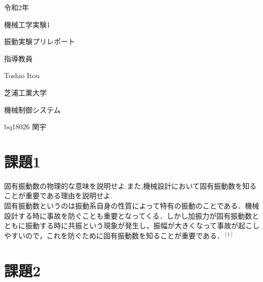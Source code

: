\documentclass[xelatex,ja=standard,jafont=noto]{bxjsarticle}
\date{JUNE 2020}
\begin{document}
	\begin{titlepage}
			\begin{center}
				
				{\Large 令和2年}
				
				\vspace{10truept}
				
				{\Large 機械工学実験1}
				
				\vspace*{140truept}
				
				{\Huge 振動実験プリレポート} 
				
				\vspace{160truept}
				
				{\Large 指導教員}
				
				\vspace{10truept}
				
				{\Large Toshio Itou}
				
				\vspace{70truept}
				
				{\Large 芝浦工業大学}
				
				\vspace{10truept}
				
				{\Large 機械制御システム}
				
				\vspace{30truept}
				
				{\Large bq18026 関宇}      
				
			\end{center}
		\end{titlepage}

\section{課題1}

固有振動数の物理的な意味を説明せよ.また,機械設計において固有振動数を知ることが重要である理由を説明せよ.\\

固有振動数というのは振動系自身の性質によって特有の振動のことである．機械設計する時に事故を防ぐことも重要となってくる．しかし加振力が固有振動数とともに振動する時に共振という現象が発生し，振幅が大きくなって事故が起こしやすいので，これを防ぐために固有振動数を知ることが重要である．$　^{[1]}　$



\section{課題2}
\end{document}
